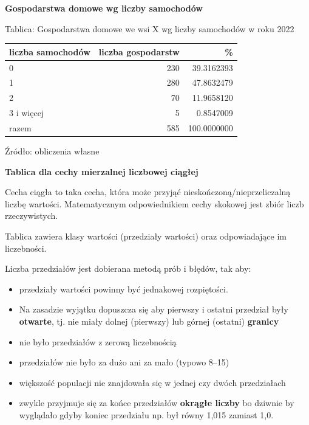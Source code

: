 \documentclass[
  openany]{book}
\begin{document}
\begin{example}
\textbf{Gospodarstwa domowe wg liczby samochodów}

Tablica: Gospodarstwa domowe we wsi X wg liczby samochodów w roku 2022

\begin{tabular}{l|r|r}
\hline
liczba samochodów & liczba gospodarstw & \%\\
\hline
0 & 230 & 39.3162393\\
\hline
1 & 280 & 47.8632479\\
\hline
2 & 70 & 11.9658120\\
\hline
3 i więcej & 5 & 0.8547009\\
\hline
razem & 585 & 100.0000000\\
\hline
\end{tabular}

Źródło: obliczenia własne
\end{example}

\textbf{Tablica dla cechy mierzalnej liczbowej ciągłej}

Cecha ciągła to taka cecha, która może przyjąć nieskończoną/nieprzeliczalną liczbę wartości.
Matematycznym odpowiednikiem cechy skokowej jest zbiór liczb rzeczywistych.

Tablica zawiera klasy wartości (przedziały wartości)
oraz odpowiadające im liczebności.

Liczba przedziałów jest dobierana metodą prób i błędów, tak aby:

\begin{itemize}
\item
  przedziały wartości powinny być jednakowej rozpiętości.
\item
  Na zasadzie wyjątku dopuszcza się aby pierwszy i ostatni przedział
  były \textbf{otwarte}, tj. nie miały dolnej (pierwszy) lub górnej (ostatni) \textbf{granicy}
\item
  nie było przedziałów z zerową liczebnością
\item
  przedziałów nie było za dużo ani za mało (typowo 8--15)
\item
  większość populacji nie znajdowała się w jednej czy dwóch przedziałach
\item
  zwykle przyjmuje się za końce przedziałów \textbf{okrągłe liczby}
  bo dziwnie
  by wyglądało gdyby koniec przedziału np. był równy 1,015 zamiast 1,0.
\end{itemize}
\end{document}
